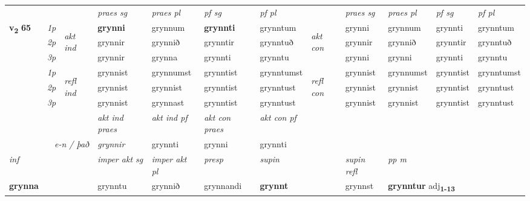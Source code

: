 \begin{longtable}[l]{X>{\footnotesize\itshape}llXXXXlXXXX}
 & &   & \textit{praes sg}  & \textit{praes pl}    & \textit{ pf sg} & \textit{pf pl} & & \textit{praes sg}  & \textit{praes pl}    & \textit{pf sg} & \textit{pf pl }  \\ \cmidrule{4-7} \cmidrule{9-12}
 \multirow{2}{*}{{{\textbf{v{\textsubscript{2}}} \Large{\textbf{65}}}}}  & 1p & \multirow{3}{*}{\begin{turn}{90}\textit{akt ind}\end{turn}} & \textbf{grynni} & grynnum & \textbf{grynnti} & grynntum & \multirow{3}{*}{\begin{turn}{90}\textit{akt con}\end{turn}} &grynni & grynnum & grynnti & grynntum\\*
 & 2p &  &  grynnir  & grynnið & grynntir & grynntuð & & grynnir & grynnið & grynntir & grynntuð \\*
 & 3p &  & grynnir & grynna & grynnti & grynntu & & grynni & grynni& grynnti & grynntu \\*
\cmidrule{4-7} \cmidrule{9-12}
 & 1p & \multirow{3}{*}{\begin{turn}{90}\textit{refl ind}\end{turn}}  & grynnist & grynnumst & grynntist & grynntumst & \multirow{3}{*}{\begin{turn}{90}\textit{refl con}\end{turn}}  &grynnist & grynnumst & grynntist & grynntumst \\*
 & 2p &  & grynnist & grynnist & grynntist & grynntust & &grynnist & grynnist & grynntist & grynntust \\*
 & 3p  & & grynnist & grynnast & grynntist & grynntust & & grynnist & grynnist& grynntist & grynntust \\*
\cmidrule{4-7} \cmidrule{9-12}

   && &  \textit{akt ind praes} & \textit{akt ind pf} & \textit{akt con praes} & \textit{akt con pf} \\*
\multicolumn{3}{r}{\textit{e-n / það}} & grynnir & grynnti & grynni & grynnti \\*

\cmidrule{4-7}
   {\textit{inf}} & &  & \textit{imper akt sg} & \textit{imper akt pl}   & \textit{presp} & \textit{supin} && \textit{supin refl} & \textit{pp m} \\*
  {\textbf{grynna}} & && grynntu  & grynnið   & grynnandi &  \textbf{grynnt} && grynnst & \multicolumn{2}{l}{\textbf{grynntur} adj\textbf{\textsubscript{1-13}}} \\*


\end{longtable}
